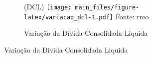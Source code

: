 \documentclass[twocolumn, a4paper, 10pt]{report}
\newcommand{\source}[1]{\scriptsize{Fonte: #1}\\}
\newcommand{\subcap}[1]{{\scriptsize\color{primarycolor}#1\newline}}
\begin{document}
    \begin{figure}[!h]
    \begin{subfigure}{\linewidth}
    \caption{Variação da Dívida Consolidada Liquida\label{fig:variacao_dcl}}
    \subcap{(DCL)}
    \texttt{[image: main\_files/figure-latex/variacao\_dcl-1.pdf]}
    \source{\acrshort{rreo}}
    \end{subfigure}
    \end{figure}

    
\end{document}
